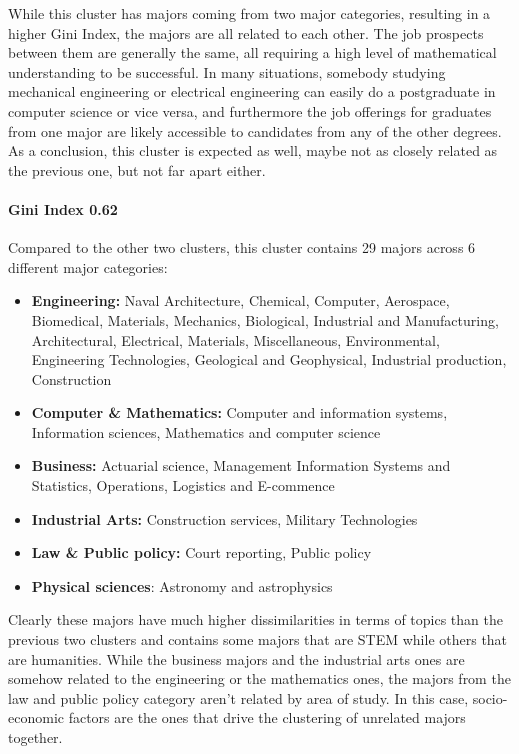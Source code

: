 \documentclass[11pt]{article}
\begin{document}
While this cluster has majors coming from two major categories, resulting in a higher Gini Index, the majors are all related to each other. The job prospects between them are generally the same, all requiring a high level of mathematical understanding to be successful. In many situations, somebody studying mechanical engineering or electrical engineering can easily do a postgraduate in computer science or vice versa, and furthermore the job offerings for graduates from one major are likely accessible to candidates from any of the other degrees. As a conclusion, this cluster is expected as well, maybe not as closely related as the previous one, but not far apart either.

\paragraph*{Gini Index 0.62}

Compared to the other two clusters, this cluster contains 29 majors across 6 different major categories:

\begin{itemize}[leftmargin=*]
    \item  \textbf{Engineering:} Naval Architecture, Chemical, Computer, Aerospace, Biomedical, Materials, Mechanics, Biological, Industrial and Manufacturing, Architectural, Electrical, Materials, Miscellaneous, Environmental, Engineering Technologies, Geological and Geophysical, Industrial production, Construction
    \item \textbf{Computer \& Mathematics:} Computer and information systems, Information sciences, Mathematics and computer science
    \item \textbf{Business:} Actuarial science, Management Information Systems and Statistics, Operations, Logistics and E-commence
    \item \textbf{Industrial Arts:} Construction services, Military Technologies 
    \item \textbf{Law \& Public policy:} Court reporting, Public policy
    \item \textbf{Physical sciences}: Astronomy and astrophysics
\end{itemize}

Clearly these majors have much higher dissimilarities in terms of topics than the previous two clusters and contains some majors that are STEM while others that are humanities. While the business majors and the industrial arts ones are somehow related to the engineering or the mathematics ones, the majors from the law and public policy category aren't related by area of study. In this case, socio-economic factors are the ones that drive the clustering of unrelated majors together. 
\end{document}
